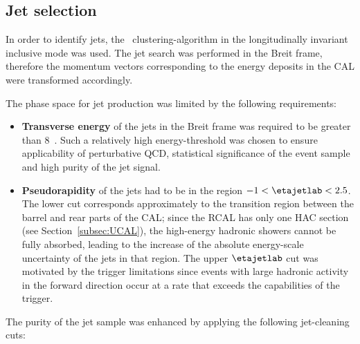 \subsection{Jet selection}
\label{subsec:jetselect}
In order to identify jets, the \kt~clustering-algorithm in the longitudinally invariant inclusive mode was used. The jet search was performed in the Breit frame, therefore the momentum vectors corresponding to the energy deposits in the CAL were transformed accordingly. 

The phase space for jet production was limited by the following requirements:
\begin{itemize}
	\item \textbf{Transverse energy} of the jets in the Breit frame was required to be greater than 8~\GeV. Such a relatively high energy-threshold was chosen to ensure applicability of perturbative QCD, statistical significance of the event sample and high purity of the jet signal.
	\item \textbf{Pseudorapidity} of the jets had to be in the region $-1<\etajetlab<2.5$. The lower cut corresponds approximately to the transition region between the barrel and rear parts of the CAL; since the RCAL has only one HAC section (see Section~\ref{subsec:UCAL}), the high-energy hadronic showers cannot be fully absorbed, leading to the increase of the absolute energy-scale uncertainty of the jets in that region. The upper $\etajetlab$ cut was motivated by the trigger limitations since events with large hadronic activity in the forward direction occur at a rate that exceeds the capabilities of the trigger.
	
\end{itemize}
The purity of the jet sample was enhanced by applying the following jet-cleaning cuts:

